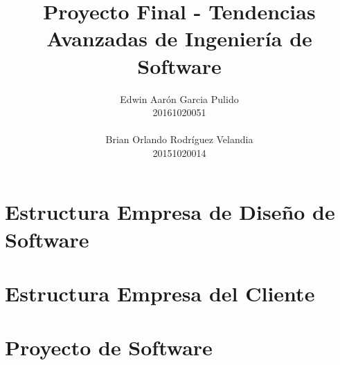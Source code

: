 \documentclass[12pt,letterpaper]{book}
\title{Proyecto Final - Tendencias Avanzadas de Ingeniería de Software}
\author{Edwin Aarón Garcia Pulido \\
20161020051 \\\\ Brian Orlando Rodríguez Velandia \\
20151020014}
\begin{document}
\maketitle
\tableofcontents

\part{Estructura Empresa de Diseño de Software}


\part{Estructura Empresa del Cliente}


\part{Proyecto de Software}





\end{document}
